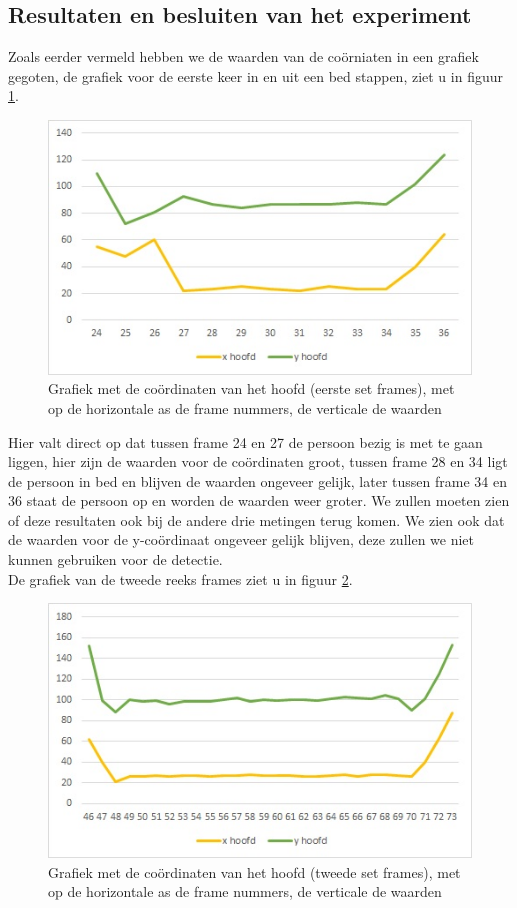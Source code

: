  \subsection{Resultaten en besluiten van het experiment}
 \label{ERefHGDB}
Zoals eerder vermeld hebben we de waarden van de co\"orniaten in een grafiek gegoten, de grafiek voor de eerste keer in en uit een bed stappen, ziet u in figuur \ref{imgCHZ}.
\begin{figure}[hbp]
	\includegraphics[scale = 0.75]{Grafiek_UitBedZ}
	\caption{Grafiek met de co\"ordinaten van het hoofd (eerste set frames), met op de horizontale as de frame nummers, de verticale de waarden}
	\label{imgCHZ}
\end{figure}
Hier valt direct op dat tussen frame 24 en 27 de persoon bezig is met te gaan liggen, hier zijn de waarden voor de co\"ordinaten groot, tussen frame 28 en 34 ligt de persoon in bed en blijven de waarden ongeveer gelijk, later tussen frame 34 en 36 staat de persoon op en worden de waarden weer groter. We zullen moeten zien of deze resultaten ook bij de andere drie metingen terug komen. We zien ook dat de waarden voor de y-co\"ordinaat ongeveer gelijk blijven, deze zullen we niet kunnen gebruiken voor de detectie. \\
De grafiek van de tweede reeks frames ziet u in figuur \ref{imgCHZT}.
\begin{figure}[hbp]
	\includegraphics[scale = 0.75]{Grafiek_UitBedZT}
	\caption{Grafiek met de co\"ordinaten van het hoofd (tweede set frames), met op de horizontale as de frame nummers, de verticale de waarden}
	\label{imgCHZT}
\end{figure}
